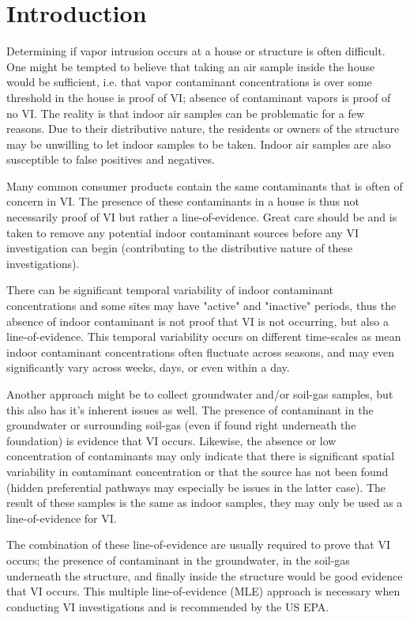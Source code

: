 \documentclass[../main.tex]{subfiles}
\begin{document}
\chapter{Introduction}


Determining if vapor intrusion occurs at a house or structure is often difficult.
One might be tempted to believe that taking an air sample inside the house would be sufficient, i.e. that vapor contaminant concentrations is over some threshold in the house is proof of VI; absence of contaminant vapors is proof of no VI.
The reality is that indoor air samples can be problematic for a few reasons.
Due to their distributive nature, the residents or owners of the structure may be unwilling to let indoor samples to be taken.
Indoor air samples are also susceptible to false positives and negatives. \par

Many common consumer products contain the same contaminants that is often of concern in VI.
The presence of these contaminants in a house is thus not necessarily proof of VI but rather a line-of-evidence.
Great care should be and is taken to remove any potential indoor contaminant sources before any VI investigation can begin (contributing to the distributive nature of these investigations). \par

There can be significant temporal variability of indoor contaminant concentrations and some sites may have "active" and "inactive" periods, thus the absence of indoor contaminant is not proof that VI is not occurring, but also a line-of-evidence.
This temporal variability occurs on different time-scales as mean indoor contaminant concentrations often fluctuate across seasons, and may even significantly vary across weeks, days, or even within a day. \par

Another approach might be to collect groundwater and/or soil-gas samples, but this also has it's inherent issues as well.
The presence of contaminant in the groundwater or surrounding soil-gas (even if found right underneath the foundation) is evidence that VI occurs.
Likewise, the absence or low concentration of contaminants may only indicate that there is significant spatial variability in contaminant concentration or that the source has not been found (hidden preferential pathways may especially be issues in the latter case).
The result of these samples is the same as indoor samples, they may only be used as a line-of-evidence for VI.\par

The combination of these line-of-evidence are usually required to prove that VI occurs; the presence of contaminant in the groundwater, in the soil-gas underneath the structure, and finally inside the structure would be good evidence that VI occurs.
This multiple line-of-evidence (MLE) approach is necessary when conducting VI investigations and is recommended by the US EPA.\par
\end{document}
